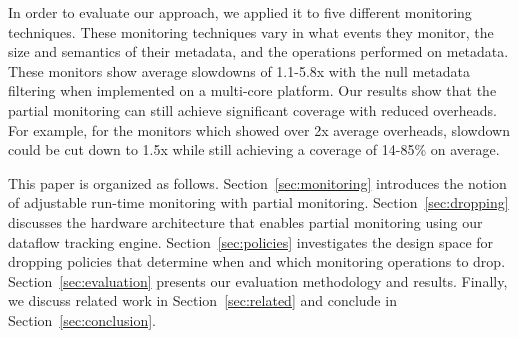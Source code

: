 
In order to evaluate our approach, we applied it to five different monitoring
techniques. These monitoring techniques vary in what events they monitor, the
size and semantics of their metadata, and the operations performed on metadata.
These monitors show average slowdowns of 1.1-5.8x with the null metadata filtering when
implemented on a multi-core platform.
Our results show that the partial monitoring can still achieve significant
coverage with reduced overheads. For example, for the monitors which showed over 2x
average overheads, slowdown could be cut down to 1.5x while still achieving a
coverage of 14-85\% on average.

This paper is organized as follows. Section~\ref{sec:monitoring} introduces the notion
of adjustable run-time monitoring with partial monitoring.
Section~\ref{sec:dropping} discusses the hardware architecture that enables 
partial monitoring using our dataflow tracking engine.
Section~\ref{sec:policies}
investigates the design space for dropping policies that determine when and which
monitoring operations to drop.
Section~\ref{sec:evaluation} presents our evaluation methodology and
results. Finally, we discuss related work in Section~\ref{sec:related} and
conclude in Section~\ref{sec:conclusion}.

